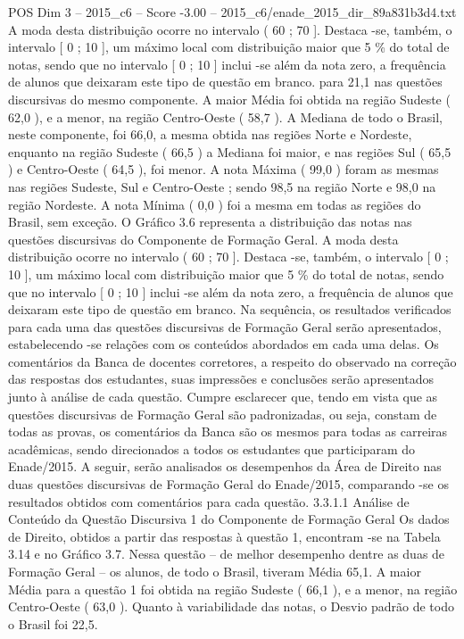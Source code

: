 \begin{textsample}{POS Dim 3 – 2015\_c6 – Score -3.00 – 2015\_c6/enade\_2015\_dir\_89a831b3d4.txt}
A moda desta distribuição ocorre no intervalo ( 60 ; 70 ].
Destaca -se, também, o intervalo [ 0 ; 10 ], um máximo local com distribuição maior que 5 \% do total de notas, sendo que no intervalo [ 0 ; 10 ] inclui -se além da nota zero, a frequência de alunos que deixaram este tipo de questão em branco. para 21,1 nas questões discursivas do mesmo componente.
A maior Média foi obtida na região Sudeste ( 62,0 ), e a menor, na região Centro-Oeste ( 58,7 ).
A Mediana de todo o Brasil, neste componente, foi 66,0, a mesma obtida nas regiões Norte e Nordeste, enquanto na região Sudeste ( 66,5 ) a Mediana foi maior, e nas regiões Sul ( 65,5 ) e Centro-Oeste ( 64,5 ), foi menor.
A nota Máxima ( 99,0 ) foram as mesmas nas regiões Sudeste, Sul e Centro-Oeste ; sendo 98,5 na região Norte e 98,0 na região Nordeste.
A nota Mínima ( 0,0 ) foi a mesma em todas as regiões do Brasil, sem exceção.
O Gráfico 3.6 representa a distribuição das notas nas questões discursivas do Componente de Formação Geral.
A moda desta distribuição ocorre no intervalo ( 60 ; 70 ].
Destaca -se, também, o intervalo [ 0 ; 10 ], um máximo local com distribuição maior que 5 \% do total de notas, sendo que no intervalo [ 0 ; 10 ] inclui -se além da nota zero, a frequência de alunos que deixaram este tipo de questão em branco.
Na sequência, os resultados verificados para cada uma das questões discursivas de Formação Geral serão apresentados, estabelecendo -se relações com os conteúdos abordados em cada uma delas.
Os comentários da Banca de docentes corretores, a respeito do observado na correção das respostas dos estudantes, suas impressões e conclusões serão apresentados junto à análise de cada questão.
Cumpre esclarecer que, tendo em vista que as questões discursivas de Formação Geral são padronizadas, ou seja, constam de todas as provas, os comentários da Banca são os mesmos para todas as carreiras acadêmicas, sendo direcionados a todos os estudantes que participaram do Enade/2015.
A seguir, serão analisados os desempenhos da Área de Direito nas duas questões discursivas de Formação Geral do Enade/2015, comparando -se os resultados obtidos com comentários para cada questão. 3.3.1.1 Análise de Conteúdo da Questão Discursiva 1 do Componente de Formação Geral Os dados de Direito, obtidos a partir das respostas à questão 1, encontram -se na Tabela 3.14 e no Gráfico 3.7.
Nessa questão – de melhor desempenho dentre as duas de Formação Geral – os alunos, de todo o Brasil, tiveram Média 65,1.
A maior Média para a questão 1 foi obtida na região Sudeste ( 66,1 ), e a menor, na região Centro-Oeste ( 63,0 ).
Quanto à variabilidade das notas, o Desvio padrão de todo o Brasil foi 22,5.

\end{textsample}
